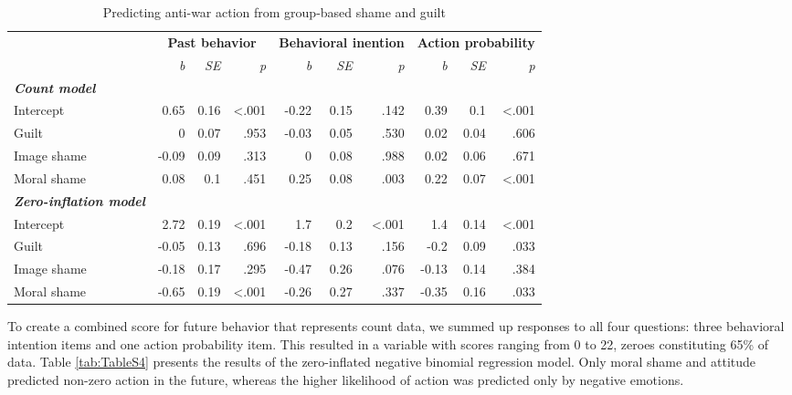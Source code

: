 \documentclass[
]{article}
\begin{document}
\begin{table}[H]

\caption{\label{tab:TableS3}Predicting anti-war action from group-based shame and guilt}
\centering
\fontsize{8}{10}\selectfont
\begin{tabular}[t]{lrrrrrrrrr}
\toprule
\multicolumn{1}{c}{\textbf{}} & \multicolumn{3}{c}{\textbf{Past behavior}} & \multicolumn{3}{c}{\textbf{Behavioral inention}} & \multicolumn{3}{c}{\textbf{Action probability}} \\
\cmidrule(l{3pt}r{3pt}){2-4} \cmidrule(l{3pt}r{3pt}){5-7} \cmidrule(l{3pt}r{3pt}){8-10}
\em{ } & \em{b} & \em{SE} & \em{p} & \em{b} & \em{SE} & \em{p} & \em{b} & \em{SE} & \em{p}\\
\midrule
\em{\textbf{Count model}} & \em{\textbf{}} & \em{\textbf{}} & \em{\textbf{}} & \em{\textbf{}} & \em{\textbf{}} & \em{\textbf{}} & \em{\textbf{}} & \em{\textbf{}} & \em{\textbf{}}\\
\midrule
Intercept & 0.65 & 0.16 & <.001 & -0.22 & 0.15 & .142 & 0.39 & 0.1 & <.001\\
Guilt & 0 & 0.07 & .953 & -0.03 & 0.05 & .530 & 0.02 & 0.04 & .606\\
Image shame & -0.09 & 0.09 & .313 & 0 & 0.08 & .988 & 0.02 & 0.06 & .671\\
Moral shame & 0.08 & 0.1 & .451 & 0.25 & 0.08 & .003 & 0.22 & 0.07 & <.001\\
\midrule
\addlinespace
\em{\textbf{Zero-inflation model}} & \em{\textbf{}} & \em{\textbf{}} & \em{\textbf{}} & \em{\textbf{}} & \em{\textbf{}} & \em{\textbf{}} & \em{\textbf{}} & \em{\textbf{}} & \em{\textbf{}}\\
\midrule
Intercept & 2.72 & 0.19 & <.001 & 1.7 & 0.2 & <.001 & 1.4 & 0.14 & <.001\\
Guilt & -0.05 & 0.13 & .696 & -0.18 & 0.13 & .156 & -0.2 & 0.09 & .033\\
Image shame & -0.18 & 0.17 & .295 & -0.47 & 0.26 & .076 & -0.13 & 0.14 & .384\\
Moral shame & -0.65 & 0.19 & <.001 & -0.26 & 0.27 & .337 & -0.35 & 0.16 & .033\\
\bottomrule
\end{tabular}
\end{table}

To create a combined score for future behavior that represents count data, we summed up responses to all four questions: three behavioral intention items and one action probability item. This resulted in a variable with scores ranging from 0 to 22, zeroes constituting 65\% of data. Table \ref{tab:TableS4} presents the results of the zero-inflated negative binomial regression model. Only moral shame and attitude predicted non-zero action in the future, whereas the higher likelihood of action was predicted only by negative emotions.
\end{document}
